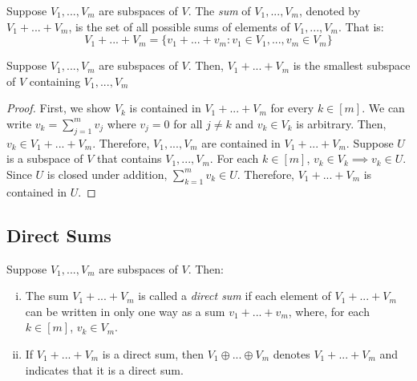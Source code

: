 \documentclass{article}
\begin{document}
\begin{definition}
  Suppose $V_1, ..., V_m$ are subspaces of $V$. The \textit{sum} of
  $V_1, ..., V_m$, denoted by $V_1 + ... + V_m$, is the set of all
  possible sums of elements of $V_1, ..., V_m$. That is:
  $$
  V_1 + ... + V_m = \{v_1 + ... + v_m: v_1 \in V_1, ..., v_m \in V_m\}
  $$
\end{definition}

\begin{theorem}
  \label{thm:sum-of-subspaces-is-smallest-containing-subspace}
  Suppose $V_1, ..., V_m$ are subspaces of $V$. Then, $V_1 + ... +
  V_m$ is the smallest subspace of $V$ containing $V_1, ..., V_m$
\end{theorem}
\begin{proof}
  First, we show $V_k$ is contained in $V_1 + ... + V_m$ for every $k
  \in [m]$. We can write $v_k = \sum_{j=1}^m v_j$ where $v_j = 0$ for
  all $j \ne k$ and $v_k \in V_k$ is arbitrary. Then, $v_k \in V_1 +
  ... + V_m$. Therefore, $V_1, ..., V_m$ are contained in $V_1 + ... +
  V_m$. Suppose $U$ is a subspace of $V$ that contains $V_1, ...,
  V_m$. For each $k \in [m]$, $v_k \in V_k \implies v_k \in U$. Since
  $U$ is closed under addition, $\sum_{k=1}^m v_k \in U$. Therefore,
  $V_1 + ... + V_m$ is contained in $U$. 
\end{proof}

\subsection{Direct Sums}

\begin{definition}
  \label{def:direct-sum}
  Suppose $V_1, ..., V_m$ are subspaces of $V$. Then:
  \begin{enumerate}[(i)]
  \item
    The sum $V_1 + ... + V_m$ is called a \textit{direct sum} if each
    element of $V_1 + ... + V_m$ can be written in only one way as a
    sum $v_1 + ... + v_m$, where, for each $k \in [m]$, $v_k \in V_m$.
  \item
    If $V_1 + ... + V_m$ is a direct sum, then $V_1 \oplus ... \oplus
    V_m$ denotes $V_1 + ... + V_m$ and indicates that it is a direct sum.
  \end{enumerate}
\end{definition}
\end{document}
